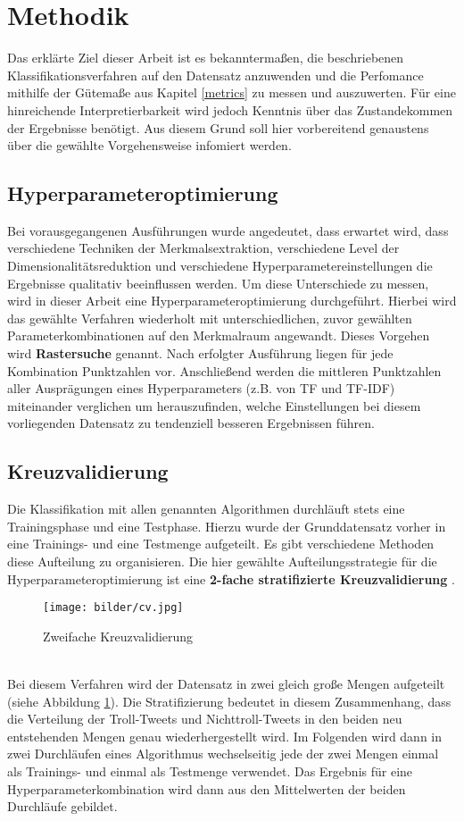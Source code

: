 \section{Methodik}\raggedbottom
Das erklärte Ziel dieser Arbeit ist es bekanntermaßen, die beschriebenen Klassifikationsverfahren auf den Datensatz anzuwenden und die Perfomance mithilfe der Gütemaße aus Kapitel \ref{metrics} zu messen und auszuwerten. Für eine hinreichende Interpretierbarkeit wird jedoch Kenntnis über das Zustandekommen der Ergebnisse benötigt. Aus diesem Grund soll hier vorbereitend genaustens über die gewählte Vorgehensweise infomiert werden.
\subsection{Hyperparameteroptimierung}
Bei vorausgegangenen Ausführungen wurde angedeutet, dass erwartet wird, dass verschiedene Techniken der Merkmalsextraktion, verschiedene Level der Dimensionalitätsreduktion und verschiedene Hyperparametereinstellungen die Ergebnisse qualitativ beeinflussen werden. Um diese Unterschiede zu messen, wird in dieser Arbeit eine Hyperparameteroptimierung \citep{bergstra11} durchgeführt. Hierbei wird das gewählte Verfahren wiederholt mit unterschiedlichen, zuvor gewählten Parameterkombinationen auf den Merkmalraum angewandt. Dieses Vorgehen wird \textbf{Rastersuche} genannt. Nach erfolgter Ausführung liegen für jede Kombination Punktzahlen vor. Anschließend werden die mittleren Punktzahlen aller Ausprägungen eines Hyperparameters (z.B. von TF und TF-IDF) miteinander verglichen um herauszufinden, welche Einstellungen bei diesem vorliegenden Datensatz zu tendenziell besseren Ergebnissen führen.
\subsection{Kreuzvalidierung}
Die Klassifikation mit allen genannten Algorithmen  durchläuft stets eine Trainingsphase und eine Testphase. Hierzu wurde der Grunddatensatz vorher in eine Trainings- und eine Testmenge aufgeteilt. Es gibt verschiedene Methoden diese Aufteilung zu organisieren. Die hier gewählte Aufteilungsstrategie für die Hyperparameteroptimierung ist eine \textbf{2-fache stratifizierte Kreuzvalidierung} \citep{berrar18}.\\
\begin{figure}[htb]
	\begin{center}
		\texttt{[image: bilder/cv.jpg]}
		\caption{Zweifache Kreuzvalidierung}\label{CV}
	\end{center}
\end{figure}\\
Bei diesem Verfahren wird der Datensatz in zwei gleich große Mengen aufgeteilt (siehe Abbildung \ref{CV}). Die Stratifizierung bedeutet in diesem Zusammenhang, dass die Verteilung der Troll-Tweets und Nichttroll-Tweets in den beiden neu entstehenden Mengen genau wiederhergestellt wird. Im Folgenden wird dann in zwei Durchläufen eines Algorithmus wechselseitig jede der zwei Mengen einmal als Trainings- und einmal als Testmenge verwendet. Das Ergebnis für eine Hyperparameterkombination wird dann aus den Mittelwerten der beiden Durchläufe gebildet.
